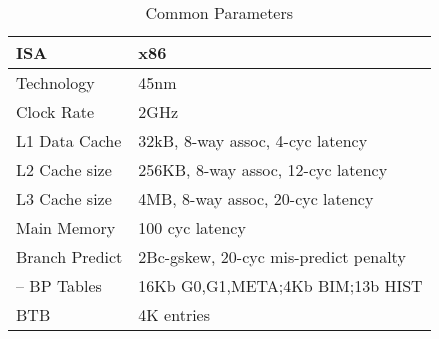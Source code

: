 \begin{table}[htbp]
\centering
\begin{tabular}{ l|l }
\hline
ISA					&x86\\ \hline
Technology          &45nm \\ \hline
Clock Rate          &2GHz\\ \hline
L1 Data Cache       &32kB, 8-way assoc, 4-cyc latency\\ \hline
L2 Cache size       &256KB, 8-way assoc, 12-cyc latency\\ \hline
L3 Cache size       &4MB, 8-way assoc, 20-cyc latency\\ \hline
Main Memory         &100 cyc latency\\ \hline
Branch Predict	    &2Bc-gskew, 20-cyc mis-predict penalty\\ \hline
-- BP Tables        &16Kb G0,G1,META;4Kb BIM;13b HIST\\ \hline
BTB                 &4K entries \\ \hline
\end{tabular}
\caption{Common Parameters}
\label{tab:params}
\end{table}

